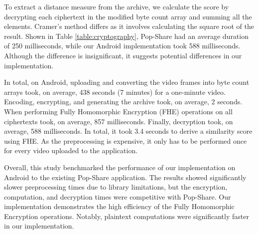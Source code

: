 To extract a distance measure from the archive, we calculate the score by decrypting each ciphertext in the modified byte count array and summing all the elements. Cramer's method differs as it involves calculating the square root of the result. Shown in Table \ref{table:cryptography}, Pop-Share had an average duration of 250 milliseconds, while our Android implementation took 588 milliseconds. Although the difference is insignificant, it suggests potential differences in our implementation.

In total, on Android, uploading and converting the video frames into byte count arrays took, on average, 438 seconds (7 minutes) for a one-minute video. Encoding, encrypting, and generating the archive took, on average, 2 seconds. When performing Fully Homomorphic Encryption (FHE) operations on all ciphertexts took, on average, 857 milliseconds. Finally, decryption took, on average, 588 milliseconds. In total, it took 3.4 seconds to derive a similarity score using FHE. As the preprocessing is expensive, it only has to be performed once for every video uploaded to the application.

Overall, this study benchmarked the performance of our implementation on Android to the existing Pop-Share application. The results showed significantly slower preprocessing times due to library limitations, but the encryption, computation, and decryption times were competitive with Pop-Share. Our implementation demonstrates the high efficiency of the Fully Homomorphic Encryption operations. Notably, plaintext computations were significantly faster in our implementation.
